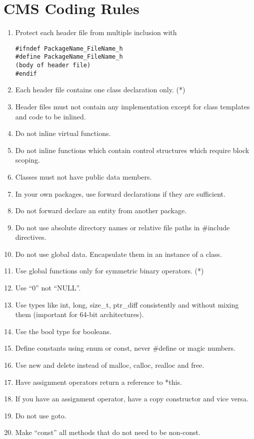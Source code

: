 \documentclass{cmspaper}
\begin{document}
\section{CMS Coding Rules}

\begin{enumerate}

\item Protect each header file from multiple inclusion with
\begin{verbatim}
#ifndef PackageName_FileName_h
#define PackageName_FileName_h
(body of header file)
#endif
\end{verbatim}
\item Each header file contains one class declaration only. (*)
\item Header files must not contain any implementation except for
  class templates and code to be inlined.
\item Do not inline virtual functions.
\item Do not inline functions which contain control structures which require block scoping.
\item Classes must not have public data members.
\item In your own packages, use forward declarations if they are sufficient. 
\item Do not forward declare an entity from another package.
\item Do not use absolute directory names or relative file paths in \#include directives.
\item Do not use global data. Encapsulate them in an instance of a class.
\item Use global functions only for symmetric binary operators. (*) 
\item Use ``0'' not ``NULL''.
\item Use types like int, long, size\_t, ptr\_diff consistently and
  without mixing them (important for 64-bit architectures).
\item Use the bool type for booleans.
\item Define constants using enum or const, never \#define or magic
  numbers.
\item Use new and delete instead of malloc, calloc, realloc and free.
\item Have assignment operators return a reference to *this.
\item If you have an assignment operator, have a copy constructor and
  vice versa.
\item Do not use goto.
\item Make ``const'' all methods that do not need to be non-const.

\end{enumerate}
\end{document}
